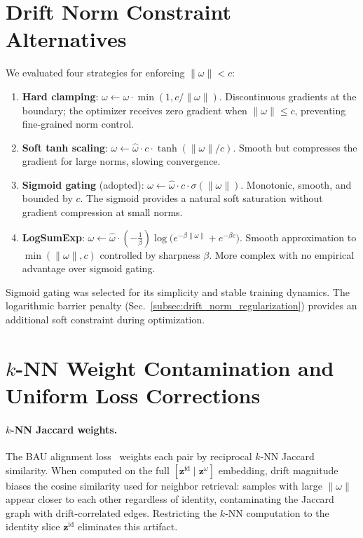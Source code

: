 \section{Drift Norm Constraint Alternatives} \label{sec:suppl_norm_constraints}
We evaluated four strategies for enforcing $\|\omega\| < c$:

\begin{enumerate}
    \item \textbf{Hard clamping}: $\omega \leftarrow \omega \cdot \min(1, c/\|\omega\|)$. Discontinuous gradients at the boundary; the optimizer receives zero gradient when $\|\omega\| \leq c$, preventing fine-grained norm control.
    \item \textbf{Soft tanh scaling}: $\omega \leftarrow \hat{\omega} \cdot c \cdot \tanh(\|\omega\|/c)$. Smooth but compresses the gradient for large norms, slowing convergence.
    \item \textbf{Sigmoid gating} (adopted): $\omega \leftarrow \hat{\omega} \cdot c \cdot \sigma(\|\omega\|)$. Monotonic, smooth, and bounded by $c$. The sigmoid provides a natural soft saturation without gradient compression at small norms.
    \item \textbf{LogSumExp}: $\omega \leftarrow \hat{\omega} \cdot (-\frac{1}{\beta})\log\bigl(e^{-\beta\|\omega\|} + e^{-\beta c}\bigr)$. Smooth approximation to $\min(\|\omega\|, c)$ controlled by sharpness $\beta$. More complex with no empirical advantage over sigmoid gating.
\end{enumerate}

Sigmoid gating was selected for its simplicity and stable training dynamics. The logarithmic barrier penalty (Sec.~\ref{subsec:drift_norm_regularization}) provides an additional soft constraint during optimization.

\section{$k$-NN Weight Contamination and Uniform Loss Corrections} \label{sec:suppl_knn_uniform}
\paragraph{$k$-NN Jaccard weights.}
The BAU alignment loss~\cite{cho2024generalizable} weights each pair by reciprocal $k$-NN Jaccard similarity. When computed on the full $[\mathbf{z}^{\mathrm{id}} \mid \mathbf{z}^{\omega}]$ embedding, drift magnitude biases the cosine similarity used for neighbor retrieval: samples with large $\|\omega\|$ appear closer to each other regardless of identity, contaminating the Jaccard graph with drift-correlated edges. Restricting the $k$-NN computation to the identity slice $\mathbf{z}^{\mathrm{id}}$ eliminates this artifact.

